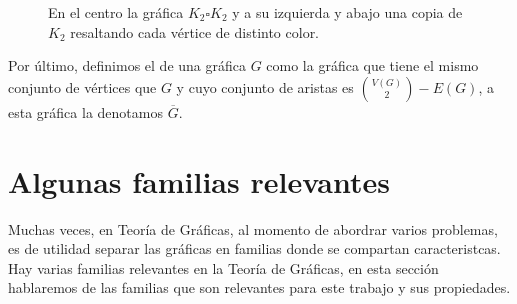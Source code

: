 \begin{figure}[ht!]
    \centering
        \caption{En el centro la gr\'afica $K_2 \square K_2$ y a su izquierda y 
        abajo una copia de $K_2$ resaltando cada v\'ertice de distinto color.}
        \label{fig:ex-cartesiano}
    \end{figure}

Por \'ultimo, definimos el  de una gr\'afica $G$ como la
gr\'afica que tiene el mismo conjunto de v\'ertices que $G$ y cuyo conjunto de
aristas es $\binom{V(G)}{2} - E(G)$, a esta gr\'afica la denotamos $\overline{G}$.


\section{Algunas familias relevantes}
\label{sec:famGraf}
   
 Muchas veces, en Teor\'ia de Gr\'aficas, al momento de abordrar varios
problemas, es de utilidad separar las gr\'aficas en familias donde se compartan
caracteristcas. Hay varias familias relevantes en la Teor\'ia de Gr\'aficas, en
esta secci\'on hablaremos de las familias que son relevantes para este trabajo y
sus propiedades.

